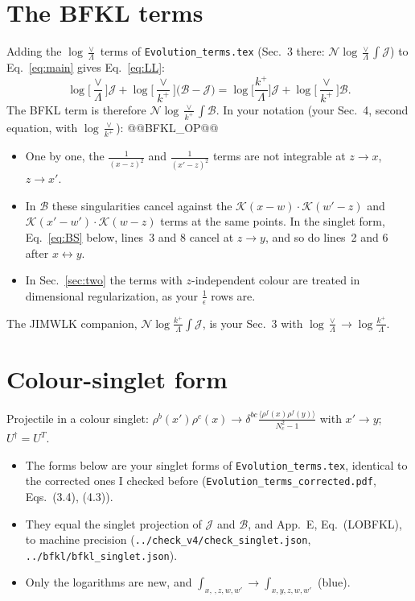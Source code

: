\documentclass[10pt]{article}
\numberwithin{equation}{section}
\newcommand{\KK}{\mathcal K}
\newcommand{\NN}{\mathcal N}
\newcommand{\BB}{\mathcal B}
\newcommand{\JJ}{\mathcal J}
\begin{document}
\section{The BFKL terms}\label{sec:bfkl}
Adding the $\log\frac{\vee}{\Lambda}$ terms of \texttt{Evolution\_terms.tex} (Sec.~3 there: $\NN\log\frac{\vee}{\Lambda}\int\JJ$) to Eq.~\eqref{eq:main} gives Eq.~\eqref{eq:LL}:
\begin{equation*}
\log\Big[\frac{\vee}{\Lambda}\Big]\JJ+\log\Big[\frac{\vee}{k^+}\Big]\big(\BB-\JJ\big)=\log\Big[\frac{k^+}{\Lambda}\Big]\JJ+\log\Big[\frac{\vee}{k^+}\Big]\BB .
\end{equation*}
The BFKL term is therefore $\NN\log\frac{\vee}{k^+}\int\BB$. In your notation (your Sec.~4, second equation, with $\log\frac{\vee}{k^+}$):
@@BFKL_OP@@
\begin{itemize}
\item One by one, the $\frac{1}{(x-z)^2}$ and $\frac{1}{(x'-z)^2}$ terms are not integrable at $z\to x$, $z\to x'$.
\item In $\BB$ these singularities cancel against the $\KK(x-w)\cdot\KK(w'-z)$ and $\KK(x'-w')\cdot\KK(w-z)$ terms at the same points. In the singlet form, Eq.~\eqref{eq:BS} below, lines~3 and 8 cancel at $z\to y$, and so do lines~2 and 6 after $x\leftrightarrow y$.
\item In Sec.~\ref{sec:two} the terms with $z$-independent colour are treated in dimensional regularization, as your $\frac1\epsilon$ rows are.
\end{itemize}
The JIMWLK companion, $\NN\log\frac{k^+}{\Lambda}\int\JJ$, is your Sec.~3 with $\log\frac{\vee}{\Lambda}\to\log\frac{k^+}{\Lambda}$.

\section{Colour-singlet form}\label{sec:singlet}
Projectile in a colour singlet: $\rho^b(x')\rho^c(x)\to\delta^{bc}\frac{\langle\rho^f(x)\rho^f(y)\rangle}{N_c^2-1}$ with $x'\to y$; $U^\dagger=U^T$.
\begin{itemize}
\item The forms below are your singlet forms of \texttt{Evolution\_terms.tex}, identical to the corrected ones I checked before (\texttt{Evolution\_terms\_corrected.pdf}, Eqs.~(3.4), (4.3)).
\item They equal the singlet projection of $\JJ$ and $\BB$, and App.~E, Eq.~(LOBFKL), to machine precision (\texttt{../check\_v4/check\_singlet.json}, \texttt{../bfkl/bfkl\_singlet.json}).
\item Only the logarithms are new, and $\int_{x,\,,z,w,w'}\to\int_{x,y,z,w,w'}$ (blue).
\end{itemize}
\end{document}
